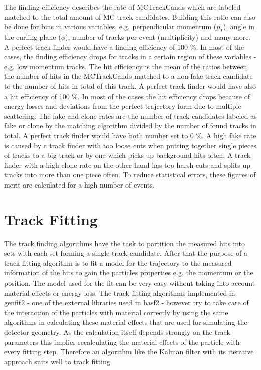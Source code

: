 The finding efficiency describes the rate of MCTrackCands which are labeled matched to the total amount of MC track candidates. Building this ratio can also be done for bins in various variables, e.g. perpendicular momentum ($p_T$), angle in the curling plane ($\phi$), number of tracks per event (multiplicity) and many more. A perfect track finder would have a finding efficiency of 100 \%. In most of the cases, the finding efficiency drops for tracks in a certain region of these variables - e.g. low momentum tracks.
The hit efficiency is the mean of the ratios between the number of hits in the MCTrackCands matched to a non-fake track candidate to the number of hits in total of this track. A perfect track finder would have also a hit efficiency of 100 \%. In most of the cases the hit efficiency drops because of energy losses and deviations from the perfect trajectory form due to multiple scattering.
The fake and clone rates are the number of track candidates labeled as fake or clone by the matching algorithm divided by the number of found tracks in total. A perfect track finder would have both number set to 0 \%. A high fake rate is caused by a track finder with too loose cuts when putting together single pieces of tracks to a big track or by one which picks up background hits often. A track finder with a high clone rate on the other hand has too harsh cuts and splits up tracks into more than one piece often. To reduce statistical errors, these figures of merit are calculated for a high number of events.

\section{Track Fitting} \label{section-fitting}

The track finding algorithms have the task to partition the measured hits into sets with each set forming a single track candidate. After that the purpose of a track fitting algorithm is to fit a model for the trajectory to the measured information of the hits to gain the particles properties e.g. the momentum or the position. The model used for the fit can be very easy without taking into account material effects or energy loss. The track fitting algorithms implemented in genfit2 - one of the external libraries used in basf2 - however try to take care of the interaction of the particles with material correctly by using the same algorithms in calculating these material effects that are used for simulating the detector geometry. As the calculation itself depends strongly on the track parameters this implies recalculating the material effects of the particle with every fitting step. Therefore an algorithm like the Kalman filter with its iterative approach suits well to track fitting.

